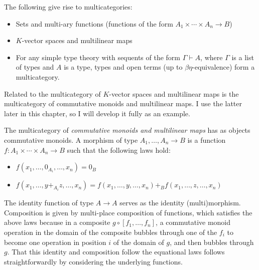 \begin{example}
  The following give rise to multicategories:
  \begin{itemize}
    \item Sets and multi-ary functions (functions of the form
      $A_1 \times \cdots \times A_n \to B$)
    \item $K$-vector spaces and multilinear maps
    \item For any simple type theory with sequents of the form
      $\Gamma \vdash A$, where $\Gamma$ is a list of types and $A$ is a type,
      types and open terms (up to $\beta\eta$-equivalence) form a multicategory.
  \end{itemize}
\end{example}

Related to the multicategory of $K$-vector spaces and multilinear maps is the
multicategory of commutative monoids and multilinear maps.
I use the latter later in this chapter, so I will
develop it fully as an example.

\begin{example}
  The multicategory of \emph{commutative monoids and multilinear maps} has as
  objects commutative monoids.
  A morphism of type $A_1, \ldots, A_n \to B$ is a function
  $f : A_1 \times \cdots \times A_n \to B$ such that the following laws hold:
  \begin{itemize}
    \item $f(x_1, \ldots, 0_{A_i}, \ldots, x_n) = 0_B$
    \item $f(x_1, \ldots, y +_{A_i} z, \ldots, x_n) =
      f(x_1, \ldots, y, \ldots, x_n) +_B f(x_1, \ldots, z, \ldots, x_n)$
  \end{itemize}
  The identity function of type $A \to A$ serves as the identity
  (multi)morphism.
  Composition is given by multi-place composition of functions, which satisfies
  the above laws because in a composite $g \circ [f_1, \ldots, f_n]$, a
  commutative monoid operation in the domain of the composite bubbles through
  one of the $f_i$ to become one operation in position $i$ of the domain of $g$,
  and then bubbles through $g$.
  That this identity and composition follow the equational laws follows
  straightforwardly by considering the underlying functions.
\end{example}

